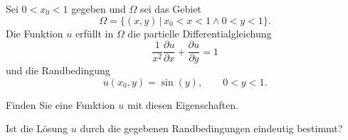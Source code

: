 Sei $0 < x_0 < 1$ gegeben und $\Omega$ sei das Gebiet
\begin{equation}
\Omega
=
\{ (x,y)\,|\, x_0 < x < 1 \wedge 0 < y < 1 \}.
\label{30000014:gebiet}
\end{equation}
Die Funktion $u$ erfüllt in $\Omega$ die partielle Differentialgleichung
\begin{equation}
\frac{1}{x^2} \frac{\partial u}{\partial x}
+
\frac{\partial u}{\partial y}
=
1
\label{30000014:gleichung}
\end{equation}
und die Randbedingung
\[
u(x_0, y) = \sin(y), \qquad 0 < y < 1.
\]
\begin{teilaufgaben}
\item
Finden Sie eine Funktion $u$ mit diesen Eigenschaften.
\item
Ist die Lösung $u$ durch die gegebenen Randbedingungen eindeutig bestimmt?
\end{teilaufgaben}

